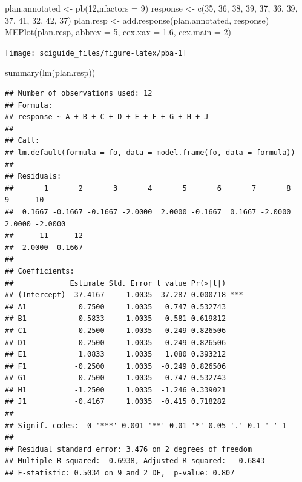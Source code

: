 \documentclass[]{tufte-book}
\newenvironment{Shaded}{}{}
\newcommand{\AttributeTok}[1]{\textcolor[rgb]{0.49,0.56,0.16}{#1}}
\newcommand{\DecValTok}[1]{\textcolor[rgb]{0.25,0.63,0.44}{#1}}
\newcommand{\FloatTok}[1]{\textcolor[rgb]{0.25,0.63,0.44}{#1}}
\newcommand{\FunctionTok}[1]{\textcolor[rgb]{0.02,0.16,0.49}{#1}}
\newcommand{\NormalTok}[1]{#1}
\newcommand{\OtherTok}[1]{\textcolor[rgb]{0.00,0.44,0.13}{#1}}
\begin{document}
\begin{Shaded}
\begin{Highlighting}[]
\NormalTok{plan.annotated }\OtherTok{\textless{}{-}} \FunctionTok{pb}\NormalTok{(}\DecValTok{12}\NormalTok{,}\AttributeTok{nfactors =} \DecValTok{9}\NormalTok{)}
\NormalTok{response }\OtherTok{\textless{}{-}} \FunctionTok{c}\NormalTok{(}\DecValTok{35}\NormalTok{, }\DecValTok{36}\NormalTok{, }\DecValTok{38}\NormalTok{, }\DecValTok{39}\NormalTok{, }\DecValTok{37}\NormalTok{, }\DecValTok{36}\NormalTok{, }\DecValTok{39}\NormalTok{, }\DecValTok{37}\NormalTok{, }\DecValTok{41}\NormalTok{, }\DecValTok{32}\NormalTok{, }\DecValTok{42}\NormalTok{, }\DecValTok{37}\NormalTok{)}
\NormalTok{plan.resp }\OtherTok{\textless{}{-}} \FunctionTok{add.response}\NormalTok{(plan.annotated, response)}
\FunctionTok{MEPlot}\NormalTok{(plan.resp, }\AttributeTok{abbrev =} \DecValTok{5}\NormalTok{, }\AttributeTok{cex.xax =} \FloatTok{1.6}\NormalTok{, }\AttributeTok{cex.main =} \DecValTok{2}\NormalTok{)}
\end{Highlighting}
\end{Shaded}

\texttt{[image: sciguide\_files/figure-latex/pba-1]}

\begin{Shaded}
\begin{Highlighting}[]
\FunctionTok{summary}\NormalTok{(}\FunctionTok{lm}\NormalTok{(plan.resp))}
\end{Highlighting}
\end{Shaded}

\begin{verbatim}
## Number of observations used: 12 
## Formula:
## response ~ A + B + C + D + E + F + G + H + J
## 
## Call:
## lm.default(formula = fo, data = model.frame(fo, data = formula))
## 
## Residuals:
##       1       2       3       4       5       6       7       8       9      10 
##  0.1667 -0.1667 -0.1667 -2.0000  2.0000 -0.1667  0.1667 -2.0000  2.0000 -2.0000 
##      11      12 
##  2.0000  0.1667 
## 
## Coefficients:
##             Estimate Std. Error t value Pr(>|t|)    
## (Intercept)  37.4167     1.0035  37.287 0.000718 ***
## A1            0.7500     1.0035   0.747 0.532743    
## B1            0.5833     1.0035   0.581 0.619812    
## C1           -0.2500     1.0035  -0.249 0.826506    
## D1            0.2500     1.0035   0.249 0.826506    
## E1            1.0833     1.0035   1.080 0.393212    
## F1           -0.2500     1.0035  -0.249 0.826506    
## G1            0.7500     1.0035   0.747 0.532743    
## H1           -1.2500     1.0035  -1.246 0.339021    
## J1           -0.4167     1.0035  -0.415 0.718282    
## ---
## Signif. codes:  0 '***' 0.001 '**' 0.01 '*' 0.05 '.' 0.1 ' ' 1
## 
## Residual standard error: 3.476 on 2 degrees of freedom
## Multiple R-squared:  0.6938, Adjusted R-squared:  -0.6843 
## F-statistic: 0.5034 on 9 and 2 DF,  p-value: 0.807
\end{verbatim}
\end{document}

